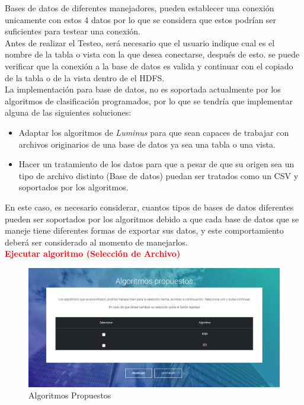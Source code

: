 Bases de datos de diferentes manejadores, pueden establecer una conexión unicamente con estos 4 datos por lo que se considera que estos podrían ser suficientes para testear una conexión.\\ 
Antes de realizar el Testeo, será necesario que el usuario indique cual es el nombre de la tabla o vista con la que desea conectarse, después de esto. se puede verificar que la conexión a la base de datos es valida y continuar con el copiado de la tabla o de la vista dentro de el HDFS.\\
La implementación para base de datos, no es soportada actualmente por los algoritmos de clasificación programados, por lo que se tendría que implementar alguna de las siguientes soluciones:\\
\begin{itemize}
	\item Adaptar los algoritmos de \emph{Luminus} para que sean capaces de trabajar con archivos originarios de una base de datos ya sea una tabla o una vista.
	\item Hacer un tratamiento de los datos para que a pesar de que su origen sea un tipo de archivo distinto (Base de datos) puedan ser tratados como un CSV y soportados por los algoritmos. 
\end{itemize}  
En este caso, es necesario considerar, cuantos tipos de bases de datos diferentes pueden ser soportados por los algoritmos debido a que cada base de datos que se maneje tiene diferentes formas de exportar sus datos, y este comportamiento deberá ser considerado al momento de manejarlos.\\
\textbf{\textcolor{red}{Ejecutar algoritmo (Selección de Archivo)}}
\begin{figure}[H]
	\hypertarget{fig:red}{\hspace{1pt}}
	\begin{center}
		\includegraphics[width=1\textwidth]{capitulo7/images/algoritmospro.png}
		\caption{Algoritmos Propuestos}
		\label{fig:algo}
	\end{center}
\end{figure}
